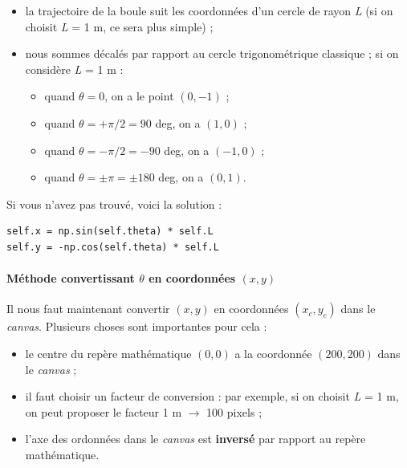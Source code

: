 \documentclass[a4paper,11pt,twoside]{book}
\providecommand{\tightlist}{%
  \setlength{\itemsep}{0pt}\setlength{\parskip}{0pt}}
\let\oldparagraph\paragraph
\renewcommand{\paragraph}[1]{\oldparagraph{#1}\mbox{}}
\begin{document}
\begin{itemize}
\tightlist
\item
  la trajectoire de la boule suit les coordonnées d'un cercle de rayon
  \emph{L} (si on choisit \emph{L} = 1 m, ce sera plus simple) ;
\item
  nous sommes décalés par rapport au cercle trigonométrique classique ;
  si on considère \emph{L} = 1 m :

  \begin{itemize}
  \tightlist
  \item
    quand \(\theta = 0\), on a le point \((0, -1)\) ;
  \item
    quand \(\theta = + \pi / 2 = 90\) deg, on a \((1, 0)\) ;
  \item
    quand \(\theta = - \pi / 2 = -90\) deg, on a \((-1, 0)\) ;
  \item
    quand \(\theta = \pm \pi = \pm 180\) deg, on a \((0, 1)\).
  \end{itemize}
\end{itemize}

Si vous n'avez pas trouvé, voici la solution :

\begin{verbatim}
self.x = np.sin(self.theta) * self.L
self.y = -np.cos(self.theta) * self.L
\end{verbatim}

\paragraph{\texorpdfstring{Méthode convertissant \(\theta\) en
coordonnées
\((x, y)\)}{Méthode convertissant \textbackslash{}theta en coordonnées (x, y)}}\label{muxe9thode-convertissant-theta-en-coordonnuxe9es-x-y}

Il nous faut maintenant convertir \((x, y)\) en coordonnées
\((x_{c}, y_{c})\) dans le \emph{canvas}. Plusieurs choses sont
importantes pour cela :

\begin{itemize}
\tightlist
\item
  le centre du repère mathématique \((0, 0)\) a la coordonnée
  \((200, 200)\) dans le \emph{canvas} ;
\item
  il faut choisir un facteur de conversion : par exemple, si on choisit
  \emph{L} = 1 m, on peut proposer le facteur 1 m \(\rightarrow\) 100
  pixels ;
\item
  l'axe des ordonnées dans le \emph{canvas} est \textbf{inversé} par
  rapport au repère mathématique.
\end{itemize}
\end{document}
